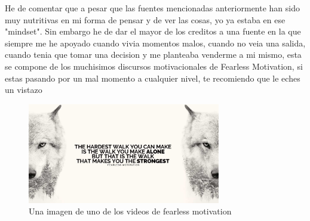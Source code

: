 He de comentar que a pesar que las fuentes mencionadas anteriormente han sido muy nutritivas en mi forma de pensar y de ver las cosas, yo ya estaba en ese "mindset". Sin embargo he de dar el mayor de los creditos a una fuente en la que siempre me he apoyado cuando vivia momentos malos, cuando no veia una salida, cuando tenia que tomar una decision y me planteaba venderme a mi mismo, esta se compone de los muchisimos discursos motivacionales de Fearless Motivation, si estas pasando por un mal momento a cualquier nivel, te recomiendo que le eches un vistazo
		\begin{figure}[H]
			\centering
			\includegraphics[width=0.75\textwidth]{figures/wolf.jpeg}
			\caption{Una imagen de uno de los videos de fearless motivation}
		\end{figure}



